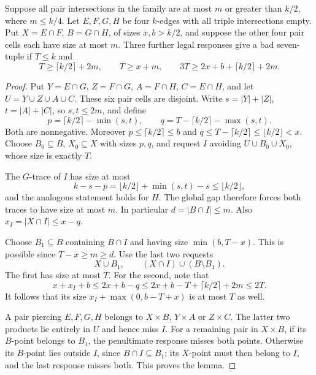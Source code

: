 \begin{lemma}\label{lem:twolarge}
Suppose all pair intersections in the family are at most $m$ or greater than $k/2$, where $m\le k/4$. Let $E,F,G,H$ be four $k$-edges with all triple intersections empty. Put $X=E\cap F$, $B=G\cap H$, of sizes $x,b>k/2$, and suppose the other four pair cells each have size at most $m$. Three further legal responses give a bad seven-tuple if $T\le k$ and
\[
T\ge\lceil k/2\rceil+2m,\qquad T\ge x+m,\qquad 3T\ge2x+b+\lceil k/2\rceil+2m.
\]
\end{lemma}
\begin{proof}
Put $Y=E\cap G$, $Z=F\cap G$, $A=F\cap H$, $C=E\cap H$, and let $U=Y\cup Z\cup A\cup C$. These six pair cells are disjoint. Write $s=|Y|+|Z|$, $t=|A|+|C|$, so $s,t\le2m$, and define
\[
p=\lceil k/2\rceil-\min(s,t),\qquad q=T-\lceil k/2\rceil-\max(s,t).
\]
Both are nonnegative. Moreover $p\le\lceil k/2\rceil\le b$ and $q\le T-\lceil k/2\rceil\le\lfloor k/2\rfloor<x$. Choose $B_0\subseteq B$, $X_0\subseteq X$ with sizes $p,q$, and request $I$ avoiding $U\cup B_0\cup X_0$, whose size is exactly $T$.

The $G$-trace of $I$ has size at most
\[
k-s-p=\lfloor k/2\rfloor+\min(s,t)-s\le\lfloor k/2\rfloor,
\]
and the analogous statement holds for $H$. The global gap therefore forces both traces to have size at most $m$. In particular $d=|B\cap I|\le m$. Also $x_I=|X\cap I|\le x-q$.

Choose $B_1\subseteq B$ containing $B\cap I$ and having size $\min(b,T-x)$. This is possible since $T-x\ge m\ge d$. Use the last two requests
\[
X\cup B_1,\qquad (X\cap I)\cup(B\setminus B_1).
\]
The first has size at most $T$. For the second, note that
\[
x+x_I+b\le2x+b-q\le2x+b-T+\lceil k/2\rceil+2m\le2T.
\]
It follows that its size $x_I+\max(0,b-T+x)$ is at most $T$ as well.

A pair piercing $E,F,G,H$ belongs to $X\times B$, $Y\times A$ or $Z\times C$. The latter two products lie entirely in $U$ and hence miss $I$. For a remaining pair in $X\times B$, if its $B$-point belongs to $B_1$, the penultimate response misses both points. Otherwise its $B$-point lies outside $I$, since $B\cap I\subseteq B_1$; its $X$-point must then belong to $I$, and the last response misses both. This proves the lemma.
\end{proof}

